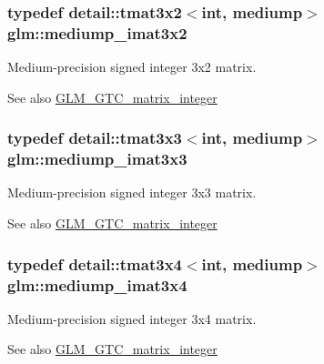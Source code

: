 \subsubsection[{\texorpdfstring{mediump\+\_\+imat3x2}{mediump_imat3x2}}]{\setlength{\rightskip}{0pt plus 5cm}typedef detail\+::tmat3x2$<$int, mediump$>$ {\bf glm\+::mediump\+\_\+imat3x2}}\hypertarget{group__gtc__matrix__integer_ga2a90775c74656b8a825f24d510f0ea5d}{}\label{group__gtc__matrix__integer_ga2a90775c74656b8a825f24d510f0ea5d}
Medium-\/precision signed integer 3x2 matrix. \begin{DoxySeeAlso}{See also}
\hyperlink{group__gtc__matrix__integer}{G\+L\+M\+\_\+\+G\+T\+C\+\_\+matrix\+\_\+integer} 
\end{DoxySeeAlso}
\subsubsection[{\texorpdfstring{mediump\+\_\+imat3x3}{mediump_imat3x3}}]{\setlength{\rightskip}{0pt plus 5cm}typedef detail\+::tmat3x3$<$int, mediump$>$ {\bf glm\+::mediump\+\_\+imat3x3}}\hypertarget{group__gtc__matrix__integer_gac5ee8dc182055bb0a00a90c031d4a714}{}\label{group__gtc__matrix__integer_gac5ee8dc182055bb0a00a90c031d4a714}
Medium-\/precision signed integer 3x3 matrix. \begin{DoxySeeAlso}{See also}
\hyperlink{group__gtc__matrix__integer}{G\+L\+M\+\_\+\+G\+T\+C\+\_\+matrix\+\_\+integer} 
\end{DoxySeeAlso}
\subsubsection[{\texorpdfstring{mediump\+\_\+imat3x4}{mediump_imat3x4}}]{\setlength{\rightskip}{0pt plus 5cm}typedef detail\+::tmat3x4$<$int, mediump$>$ {\bf glm\+::mediump\+\_\+imat3x4}}\hypertarget{group__gtc__matrix__integer_gaaac79be4db34dde570c3331ffe728d55}{}\label{group__gtc__matrix__integer_gaaac79be4db34dde570c3331ffe728d55}
Medium-\/precision signed integer 3x4 matrix. \begin{DoxySeeAlso}{See also}
\hyperlink{group__gtc__matrix__integer}{G\+L\+M\+\_\+\+G\+T\+C\+\_\+matrix\+\_\+integer} 
\end{DoxySeeAlso}
